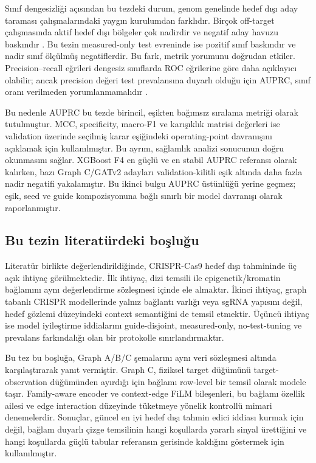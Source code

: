 Sınıf dengesizliği açısından bu tezdeki durum, genom genelinde hedef dışı aday taraması çalışmalarındaki yaygın kurulumdan farklıdır. Birçok off-target çalışmasında aktif hedef dışı bölgeler çok nadirdir ve negatif aday havuzu baskındır . Bu tezin measured-only test evreninde ise pozitif sınıf baskındır ve nadir sınıf ölçülmüş negatiflerdir. Bu fark, metrik yorumunu doğrudan etkiler. Precision--recall eğrileri dengesiz sınıflarda ROC eğrilerine göre daha açıklayıcı olabilir; ancak precision değeri test prevalansına duyarlı olduğu için AUPRC, sınıf oranı verilmeden yorumlanmamalıdır .

Bu nedenle AUPRC bu tezde birincil, eşikten bağımsız sıralama metriği olarak tutulmuştur. MCC, specificity, macro-F1 ve karışıklık matrisi değerleri ise validation üzerinde seçilmiş karar eşiğindeki operating-point davranışını açıklamak için kullanılmıştır. Bu ayrım, sağlamlık analizi sonucunun doğru okunmasını sağlar. XGBoost F4 en güçlü ve en stabil AUPRC referansı olarak kalırken, bazı Graph C/GATv2 adayları validation-kilitli eşik altında daha fazla nadir negatifi yakalamıştır. Bu ikinci bulgu AUPRC üstünlüğü yerine geçmez; eşik, seed ve guide kompozisyonuna bağlı sınırlı bir model davranışı olarak raporlanmıştır.

\subsection{Bu tezin literatürdeki boşluğu}

Literatür birlikte değerlendirildiğinde, CRISPR-Cas9 hedef dışı tahmininde üç açık ihtiyaç görülmektedir. İlk ihtiyaç, dizi temsili ile epigenetik/kromatin bağlamını aynı değerlendirme sözleşmesi içinde ele almaktır. İkinci ihtiyaç, graph tabanlı CRISPR modellerinde yalnız bağlantı varlığı veya sgRNA yapısını değil, hedef gözlemi düzeyindeki context semantiğini de temsil etmektir. Üçüncü ihtiyaç ise model iyileştirme iddialarını guide-disjoint, measured-only, no-test-tuning ve prevalans farkındalığı olan bir protokolle sınırlandırmaktır.

Bu tez bu boşluğa, Graph A/B/C şemalarını aynı veri sözleşmesi altında karşılaştırarak yanıt vermiştir. Graph C, fiziksel target düğümünü target-observation düğümünden ayırdığı için bağlamı row-level bir temsil olarak modele taşır. Family-aware encoder ve context-edge FiLM bileşenleri, bu bağlamı özellik ailesi ve edge interaction düzeyinde tüketmeye yönelik kontrollü mimari denemelerdir. Sonuçlar, güncel en iyi hedef dışı tahmin edici iddiası kurmak için değil, bağlam duyarlı çizge temsilinin hangi koşullarda yararlı sinyal ürettiğini ve hangi koşullarda güçlü tabular referansın gerisinde kaldığını göstermek için kullanılmıştır.

